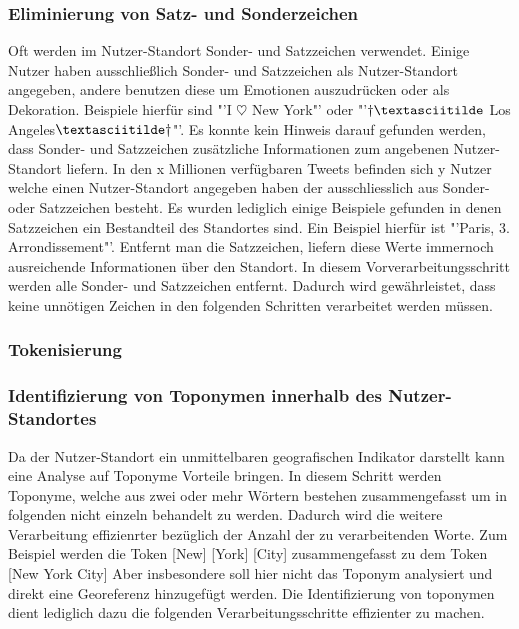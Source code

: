 		  	\subsubsection{Eliminierung von Satz- und Sonderzeichen}
			  	Oft werden im Nutzer-Standort Sonder- und Satzzeichen verwendet. 
				Einige Nutzer haben ausschließlich Sonder- und Satzzeichen als Nutzer-Standort angegeben, andere benutzen diese um Emotionen auszudrücken oder als Dekoration. 
				Beispiele hierfür sind "'I $\heartsuit$ New York"' oder "'$\dagger\textasciitilde$ Los Angeles$\textasciitilde\dagger$"'.
				Es konnte kein Hinweis darauf gefunden werden, dass Sonder- und Satzzeichen zusätzliche Informationen zum angebenen Nutzer-Standort liefern. 
				In den x Millionen verfügbaren Tweets befinden sich y Nutzer welche einen Nutzer-Standort angegeben haben der ausschliesslich aus Sonder- oder Satzzeichen besteht. 
				Es wurden lediglich einige Beispiele gefunden in denen Satzzeichen ein Bestandteil des Standortes sind.
				Ein Beispiel hierfür ist "'Paris, 3. Arrondissement"'.
				Entfernt man die Satzzeichen, liefern diese Werte immernoch ausreichende Informationen über den Standort.  
				In diesem Vorverarbeitungsschritt werden alle Sonder- und Satzzeichen entfernt. 
				Dadurch wird gewährleistet, dass keine unnötigen Zeichen in den folgenden Schritten verarbeitet werden müssen.

		  	\subsubsection{Tokenisierung}


		  	\subsubsection{Identifizierung von Toponymen innerhalb des Nutzer-Standortes}
		  		Da der Nutzer-Standort ein unmittelbaren geografischen Indikator darstellt kann eine Analyse auf Toponyme Vorteile bringen. 
		  		In diesem Schritt werden Toponyme, welche aus zwei oder mehr Wörtern bestehen zusammengefasst um in folgenden nicht einzeln behandelt zu werden.
		  		Dadurch wird die weitere Verarbeitung effizienrter bezüglich der Anzahl der zu verarbeitenden Worte. 
		  		Zum Beispiel werden die Token [New] [York] [City] zusammengefasst zu dem Token [New York City]  
		  		Aber insbesondere soll hier nicht das Toponym analysiert und direkt eine Georeferenz hinzugefügt werden. 
		  		Die Identifizierung von toponymen dient lediglich dazu die folgenden Verarbeitungsschritte effizienter zu machen. 


